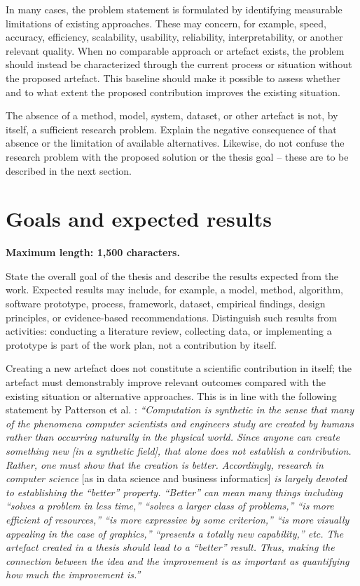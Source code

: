 \documentclass[runningheads]{llncs}
\begin{document}
In many cases, the problem statement is formulated by identifying measurable limitations of existing approaches. These may concern, for example, speed, accuracy, efficiency, scalability, usability, reliability, interpretability, or another relevant quality. When no comparable approach or artefact exists, the problem should instead be characterized through the current process or situation without the proposed artefact. This baseline should make it possible to assess whether and to what extent the proposed contribution improves the existing situation.

The absence of a method, model, system, dataset, or other artefact is not, by
itself, a sufficient research problem. Explain the negative consequence of
that absence or the limitation of available alternatives. Likewise, do not
confuse the research problem with the proposed solution or the thesis goal -- these are to be described in the next section. 

\section{Goals and expected results}
\textbf{Maximum length: 1,500 characters.}

State the overall goal of the thesis and describe the results expected from the
work. Expected results may include, for example, a model, method, algorithm,
software prototype, process, framework, dataset, empirical findings, design
principles, or evidence-based recommendations. Distinguish such results from
activities: conducting a literature review, collecting data, or implementing
a prototype is part of the work plan, not a contribution by itself.

Creating a new artefact does not constitute a scientific contribution in itself; the artefact must demonstrably improve relevant outcomes compared with the existing situation or alternative approaches. This is in line with the following statement by Patterson et al. \cite{Patterson1999}: \textit{``Computation is synthetic in the sense that many of the phenomena computer scientists and engineers study are created by humans rather than occurring naturally in the physical world. Since anyone can create something new [in a synthetic field], that alone does not establish a contribution. Rather, one must show that the creation is better. Accordingly, research in computer science} [as in data science and business informatics] \textit{is largely devoted to establishing the “better” property. “Better” can mean many things including “solves a problem in less time,” “solves a larger class of problems,” “is more efficient of resources,” “is more expressive by some criterion,” “is more visually appealing in the case of graphics,” “presents a totally new capability,” etc. The artefact created in a thesis should lead to a “better” result. Thus, making the connection between the idea and the improvement is as important as quantifying how much the improvement is.''}
\end{document}
